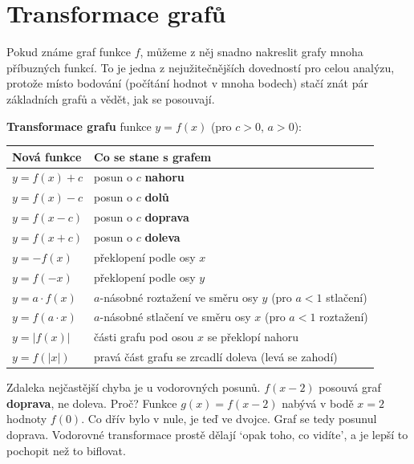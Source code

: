 \section{Transformace grafů}\label{sec:transformace-grafu}

Pokud známe graf funkce $f$, můžeme z něj snadno nakreslit grafy mnoha příbuzných funkcí. To je jedna z nejužitečnějších dovedností pro celou analýzu, protože místo bodování (počítání hodnot v mnoha bodech) stačí znát pár základních grafů a vědět, jak se posouvají.

\begin{definitionbox}
  \textbf{Transformace grafu} funkce $y = f(x)$ (pro $c > 0$, $a > 0$):
  \begin{center}
    \renewcommand{\arraystretch}{1.4}
    \begin{tabular}{|l|l|}
      \hline
      Nová funkce & Co se stane s grafem \\
      \hline
      $y = f(x) + c$ & posun o $c$ \textbf{nahoru} \\
      $y = f(x) - c$ & posun o $c$ \textbf{dolů} \\
      $y = f(x - c)$ & posun o $c$ \textbf{doprava} \\
      $y = f(x + c)$ & posun o $c$ \textbf{doleva} \\
      $y = -f(x)$ & překlopení podle osy $x$ \\
      $y = f(-x)$ & překlopení podle osy $y$ \\
      $y = a\cdot f(x)$ & $a$-násobné roztažení ve směru osy $y$ (pro $a < 1$ stlačení) \\
      $y = f(a\cdot x)$ & $a$-násobné stlačení ve směru osy $x$ (pro $a < 1$ roztažení) \\
      $y = |f(x)|$ & části grafu pod osou $x$ se překlopí nahoru \\
      $y = f(|x|)$ & pravá část grafu se zrcadlí doleva (levá se zahodí) \\
      \hline
    \end{tabular}
  \end{center}
\end{definitionbox}

Zdaleka nejčastější chyba je u vodorovných posunů. $f(x - 2)$ posouvá graf \textbf{doprava}, ne doleva. Proč? Funkce $g(x) = f(x - 2)$ nabývá v bodě $x = 2$ hodnoty $f(0)$. Co dřív bylo v nule, je teď ve dvojce. Graf se tedy posunul doprava. Vodorovné transformace prostě dělají `opak toho, co vidíte', a je lepší to pochopit než to biflovat.

